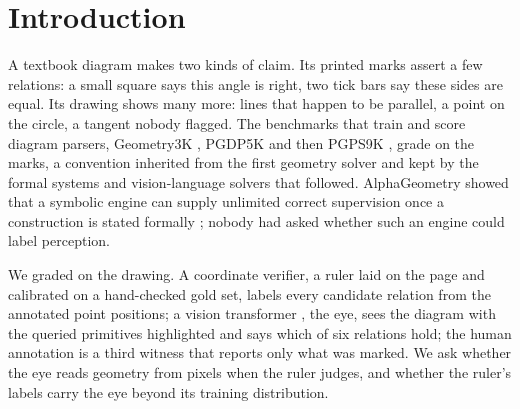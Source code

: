 \section{Introduction}
\label{sec:introduction}

A textbook diagram makes two kinds of claim. Its printed marks assert a few relations: a small square says this angle is right, two tick bars say these sides are equal. Its drawing shows many more: lines that happen to be parallel, a point on the circle, a tangent nobody flagged. The benchmarks that train and score diagram parsers, Geometry3K \cite{lu2021intergps}, PGDP5K \cite{zhang2022pgdp} and then PGPS9K \cite{zhang2023pgps}, grade on the marks, a convention inherited from the first geometry solver \cite{seo2015geos} and kept by the formal systems \cite{zhang2024formalgeo} and vision-language solvers \cite{xia2025geox} that followed. AlphaGeometry showed that a symbolic engine can supply unlimited correct supervision once a construction is stated formally \cite{trinh2024alphageometry}; nobody had asked whether such an engine could label perception.

We graded on the drawing. A coordinate verifier, a ruler laid on the page and calibrated on a hand-checked gold set, labels every candidate relation from the annotated point positions; a vision transformer \cite{dosovitskiy2021vit}, the eye, sees the diagram with the queried primitives highlighted and says which of six relations hold; the human annotation is a third witness that reports only what was marked. We ask whether the eye reads geometry from pixels when the ruler judges, and whether the ruler's labels carry the eye beyond its training distribution.
